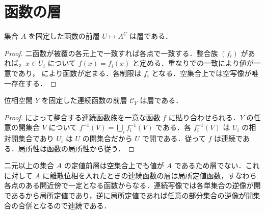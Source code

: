 \section{函数の層}
\begin{prop}[函数の前層の層性]
集合 $A$ を固定した函数の前層 $U\mapsto A^U$ は層である．
\end{prop}
\begin{proof}
二函数が被覆の各元上で一致すれば各点で一致する．整合族 $(f_i)$ があれば，$x\in U_i$ について $f(x)=f_i(x)$ と定める．重なりでの一致により値が一意であり， により函数が定まる．各制限は $f_i$ となる．空集合上では空写像が唯一存在する．
\end{proof}
\begin{prop}[連続函数の層]
位相空間 $Y$ を固定した連続函数の前層 $\mathcal C_Y$ は層である．
\end{prop}
\begin{proof}
 によって整合する連続函数族を一意な函数 $f$ に貼り合わせられる．$Y$ の任意の開集合 $V$ について $f^{-1}(V)=\bigcup_i f_i^{-1}(V)$ である．各 $f_i^{-1}(V)$ は $U_i$ の相対開集合であり $U_i$ は $U$ の開集合だから $U$ で開である．従って $f$ は連続である．局所性は函数の局所性から従う．
\end{proof}
\begin{prop}[定値前層と層の相違]
二元以上の集合 $A$ の定値前層は空集合上でも値が $A$ であるため層でない．これに対して $A$ に離散位相を入れたときの連続函数の層は局所定値函数，すなわち各点のある開近傍で一定となる函数からなる．連続写像では各単集合の逆像が開であるから局所定値であり，逆に局所定値であれば任意の部分集合の逆像が開集合の合併となるので連続である．
\end{prop}
